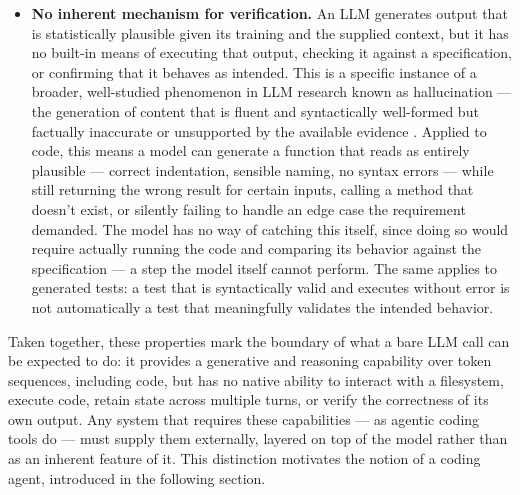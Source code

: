 \begin{itemize}
    \item \textbf{No inherent mechanism for verification.} An LLM generates output that is statistically plausible given its training and the supplied context, but it has no built-in means of executing that output, checking it against a specification, or confirming that it behaves as intended. This is a specific instance of a broader, well-studied phenomenon in LLM research known as hallucination --- the generation of content that is fluent and syntactically well-formed but factually inaccurate or unsupported by the available evidence \cite{alansari2025hallucination}. Applied to code, this means a model can generate a function that reads as entirely plausible --- correct indentation, sensible naming, no syntax errors --- while still returning the wrong result for certain inputs, calling a method that doesn't exist, or silently failing to handle an edge case the requirement demanded. The model has no way of catching this itself, since doing so would require actually running the code and comparing its behavior against the specification --- a step the model itself cannot perform. The same applies to generated tests: a test that is syntactically valid and executes without error is not automatically a test that meaningfully validates the intended behavior.
\end{itemize}

Taken together, these properties mark the boundary of what a bare LLM call can be expected to do: it provides a generative and reasoning capability over token sequences, including code, but has no native ability to interact with a filesystem, execute code, retain state across multiple turns, or verify the correctness of its own output. Any system that requires these capabilities --- as agentic coding tools do --- must supply them externally, layered on top of the model rather than as an inherent feature of it. This distinction motivates the notion of a coding agent, introduced in the following section.

